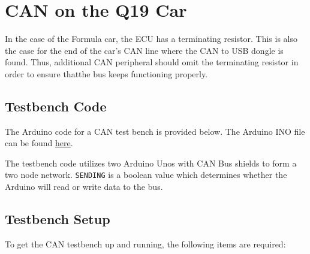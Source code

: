 \documentclass[letterpaper]{article}
\begin{document}
\section{CAN on the Q19 Car}
In the case of the Formula car, the ECU has a terminating resistor. This is also the case for
the end of the car's CAN line where the CAN to USB dongle is found. Thus,
additional CAN peripheral should omit the terminating resistor in order to ensure thatthe bus keeps
functioning properly.

\subsection{Testbench Code}
The Arduino code for a CAN test bench is provided below. The Arduino INO file can be
found
\href{https://github.com/bchampp/Q20/blob/master/CAN/testbench/testbench.ino}{here}.



\lstset{basicstyle=\ttfamily}

The testbench code utilizes two Arduino Unos with CAN Bus shields to form a
two node network. \lstinline{SENDING} is a boolean value which determines whether the
Arduino will read or write data to the bus.

\subsection{Testbench Setup}
\label{sec:setup}
To get the CAN testbench up and running, the following items are required:
\end{document}
